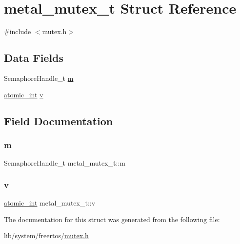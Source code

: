 \hypertarget{structmetal__mutex__t}{}\section{metal\+\_\+mutex\+\_\+t Struct Reference}
\label{structmetal__mutex__t}


{\ttfamily \#include $<$mutex.\+h$>$}

\subsection*{Data Fields}
\begin{DoxyCompactItemize}
\item 
Semaphore\+Handle\+\_\+t \hyperlink{structmetal__mutex__t_a42b9e13134d14c97d17000b7222fec9d}{m}
\item 
\hyperlink{compiler_2gcc_2atomic_8h_a3584358b6d722cb0cca04ac3cfd8a674}{atomic\+\_\+int} \hyperlink{structmetal__mutex__t_a53c99e19c962dfd308d887e681dc8897}{v}
\end{DoxyCompactItemize}


\subsection{Field Documentation}
\mbox{\label{structmetal__mutex__t_a42b9e13134d14c97d17000b7222fec9d}} 
\subsubsection{\texorpdfstring{m}{m}}
{\footnotesize\ttfamily Semaphore\+Handle\+\_\+t metal\+\_\+mutex\+\_\+t\+::m}

\mbox{\label{structmetal__mutex__t_a53c99e19c962dfd308d887e681dc8897}} 
\subsubsection{\texorpdfstring{v}{v}}
{\footnotesize\ttfamily \hyperlink{compiler_2gcc_2atomic_8h_a3584358b6d722cb0cca04ac3cfd8a674}{atomic\+\_\+int} metal\+\_\+mutex\+\_\+t\+::v}



The documentation for this struct was generated from the following file\+:\begin{DoxyCompactItemize}
\item 
lib/system/freertos/\hyperlink{system_2freertos_2mutex_8h}{mutex.\+h}\end{DoxyCompactItemize}
